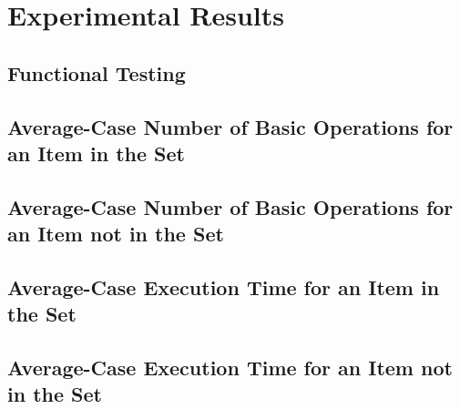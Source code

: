\documentclass{article}
\begin{document}
\section{Experimental Results}
    \subsection{Functional Testing}
    \subsection{Average-Case Number of Basic Operations for an Item in the Set}
    \subsection{Average-Case Number of Basic Operations for an Item not in the Set}
    \subsection{Average-Case Execution Time for an Item in the Set}
    \subsection{Average-Case Execution Time for an Item not in the Set}
\end{document}
